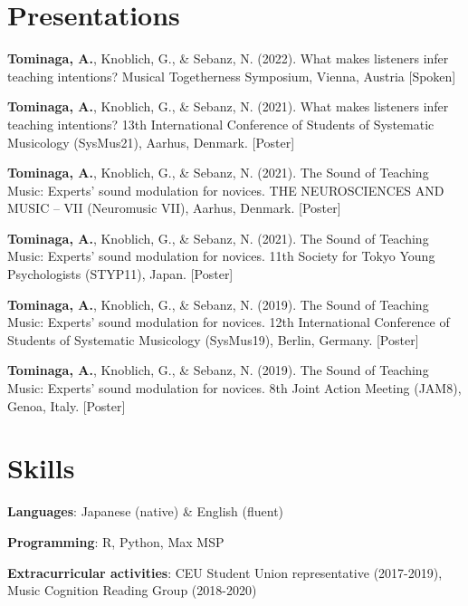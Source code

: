 \documentclass[letterpaper,11pt]{article}
\begin{document}
\section{Presentations}
\begin{itemize}[leftmargin=0.15in, label={}]
   \small{
    \item{
      \textbf{Tominaga, A.}, Knoblich, G., \& Sebanz, N. (2022). What makes listeners infer teaching intentions? Musical Togetherness Symposium, Vienna, Austria [Spoken]
    }
    \item{
      \textbf{Tominaga, A.}, Knoblich, G., \& Sebanz, N. (2021). What makes listeners infer teaching intentions? 13th International Conference of Students of Systematic Musicology (SysMus21), Aarhus, Denmark. [Poster]
    }
    \item {
      \textbf{Tominaga, A.}, Knoblich, G., \& Sebanz, N. (2021). The Sound of Teaching Music: Experts’ sound modulation for novices. THE NEUROSCIENCES AND MUSIC – VII (Neuromusic VII), Aarhus, Denmark. [Poster]
    }
    \item {
      \textbf{Tominaga, A.}, Knoblich, G., \& Sebanz, N. (2021). The Sound of Teaching Music: Experts’ sound modulation for novices. 11th Society for Tokyo Young Psychologists (STYP11), Japan. [Poster]
    }
    \item {
      \textbf{Tominaga, A.}, Knoblich, G., \& Sebanz, N. (2019). The Sound of Teaching Music: Experts’ sound modulation for novices. 12th International Conference of Students of Systematic Musicology (SysMus19), Berlin, Germany. [Poster]
    }
    \item{
      \textbf{Tominaga, A.}, Knoblich, G., \& Sebanz, N. (2019). The Sound of Teaching Music: Experts’ sound modulation for novices. 8th Joint Action Meeting (JAM8), Genoa, Italy. [Poster]
    }
   }
\end{itemize}

\section{Skills}
 \begin{itemize}[leftmargin=0.15in, label={}]
    \small{
      \item {
        \textbf{Languages}{: Japanese (native) \& English (fluent)}
      }
      \item{
        \textbf{Programming}{: R, Python, Max MSP}
      }
      \item{
        \textbf{Extracurricular activities}{: CEU Student Union representative (2017-2019)}, Music Cognition Reading Group (2018-2020)
      }
    }
 \end{itemize}


\end{document}
